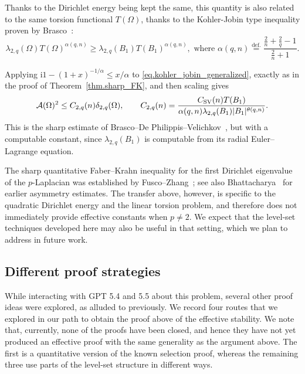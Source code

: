 \documentclass[11pt]{amsart}
\theoremstyle{plain}
\theoremstyle{definition}
\newcommand{\eqdef}{\overset{\text{def.}}{=}}
\begin{document}
Thanks to the Dirichlet energy being kept the same, this quantity is also related to the same torsion functional $T(\Omega)$, thanks to the Kohler-Jobin type inequality proven by Brasco~\cite{brasco2014torsional}: 
\begin{equation}\label{eq.kohler_jobin_generalized}
      \lambda_{2,q}(\Omega)T(\Omega)^{\alpha(q,n)}
      \ge
      \lambda_{2,q}(B_1)T(B_1)^{\alpha(q,n)},
      \text{ where }
      \alpha(q,n) \eqdef 
      \frac{\frac{2}{n} + \frac{2}{q} - 1}{\frac{2}{n} + 1}. 
\end{equation}

Applying
i$1-(1+x)^{-1/\alpha}\le x/\alpha$ to
\eqref{eq.kohler_jobin_generalized}, exactly as in the proof of
Theorem~\ref{thm.sharp_FK}, and then scaling gives
\[
 \mathcal A(\Omega)^2\le C_{2,q}(n)\delta_{2,q}(\Omega),
 \qquad
 C_{2,q}(n)=\frac{C_{\rm SV}(n)T(B_1)}
 {\alpha(q,n)\lambda_{2,q}(B_1)|B_1|^{\theta(q,n)}}.
\]
This is the sharp estimate of Brasco--De Philippis--Velichkov~\cite{brasco2015faber}, but with a
computable constant, since $\lambda_{2,q}(B_1)$ is computable from its radial
Euler--Lagrange equation.

The sharp quantitative Faber--Krahn inequality for the first Dirichlet eigenvalue of the $p$-Laplacian was established by Fusco--Zhang~\cite{FuscoZhang2017}; see also Bhattacharya~\cite{Bhattacharya2001} for earlier asymmetry estimates. The transfer above, however, is specific to the quadratic Dirichlet energy and the linear torsion problem, and therefore does not immediately provide effective constants when $p\ne2$. We expect that the level-set techniques developed here may also be useful in that setting, which we plan to address in future work.

\subsection{Different proof strategies}\label{sec.alternative_routes}

While interacting with GPT 5.4 and 5.5 about this problem, several other proof ideas were explored, as alluded to previously. We record four routes that we explored in our path to obtain the proof above of the effective stability. We note that, currently, none of the proofs have been closed, and hence they have not yet produced an effective proof with the same generality as the argument above. The first is a quantitative version of the known selection proof, whereas the remaining three use parts of the level-set structure in different ways.
\end{document}
